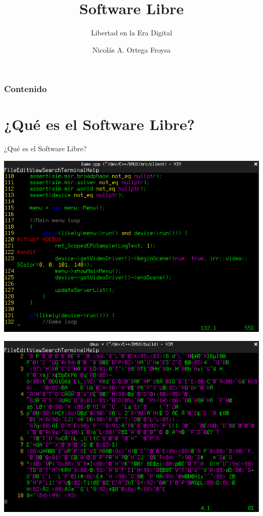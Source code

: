 \documentclass[xetex]{beamer}
\title{Software Libre}
\subtitle{Libertad en la Era Digital}
\author{Nicolás A. Ortega Froysa}
\institute{Universidad de Jáen}
\date{} %
\begin{document}
\frame{\titlepage}


\begin{frame}
    \frametitle{Contenido}
    \tableofcontents[hideallsubsections]
\end{frame}


\section{¿Qué es el Software Libre?}
\begin{frame}
    \centering \Huge ¿Qué es el Software Libre?
\end{frame}


\begin{frame}
    \centering
    \includegraphics[scale=0.4]{imgs/source}
\end{frame}


\begin{frame}
    \centering
    \includegraphics[scale=0.4]{imgs/binary}
\end{frame}
\end{document}
